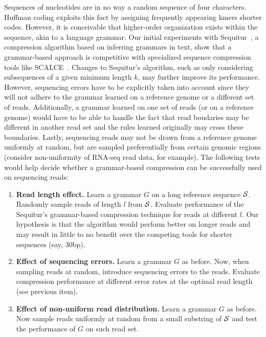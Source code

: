 \documentclass[12pt]{cmuthesis}
\begin{document}
  Sequences of nucleotides are in no way a random sequence of four characters. Huffman coding exploits this fact by assigning frequently appearing kmers shorter codes. However, it is conceivable that higher-order organization exists within the sequence, akin to a language grammar. Our initial experiments with Sequitur~\cite{Sequitur}, a compression algorithm based on inferring grammars in text, show that a grammar-based approach is competitive with specialized sequence compression tools like SCALCE~\cite{Sahinalp2012}. Changes to Sequitur's algorithm, such as only considering subsequences of a given minimum length $k$, may further improve its performance. However, sequencing errors have to be explicitly taken into account since they will not adhere to the grammar learned on a reference genome or a different set of reads. Additionally, a grammar learned on one set of reads (or on a reference genome) would have to be able to handle the fact that read boudaries may be different in another read set and the rules learned originally may cross these boundaries. Lastly, sequencing reads may not be drawn from a reference genome uniformly at random, but are sampled preferentially from certain genomic regions (consider non-uniformity of RNA-seq read data, for example). The following tests would help decide whether a grammar-based compression can be successfully used on sequencing reads:
  \begin{enumerate}
    \item \textbf{Read length effect.} Learn a grammar $G$ on a long reference sequence $\mathcal{S}$. Randomly sample reads of length $l$ from $\mathcal{S}$. Evaluate performance of the Sequitur's grammar-based compression technique for reads at different $l$. Our hypothesis is that the algorithm would perform better on longer reads and may result in little to no benefit over the competing tools for shorter sequences (say, 30bp).

    \item \textbf{Effect of sequencing errors.} Learn a grammar $G$ as before. Now, when sampling reads at random, introduce sequencing errors to the reads. Evaluate compression performance at different error rates at the optimal read length (see previous item).

    \item \textbf{Effect of non-uniform read distribution.} Learn a grammar $G$ as before. Now sample reads uniformly at random from a small substring of $\mathcal{S}$ and test the performance of $G$ on such read set.
  \end{enumerate}
\end{document}

